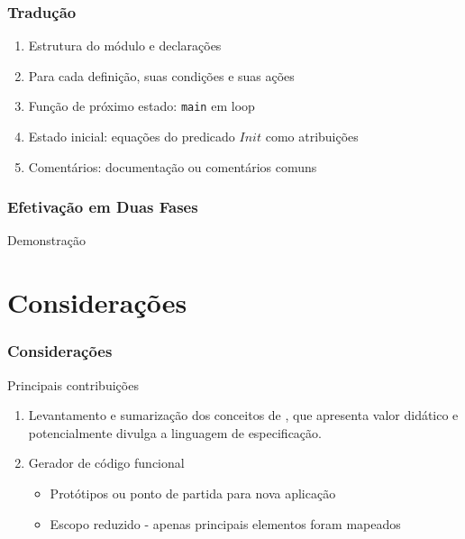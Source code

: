 \documentclass{beamer}
\begin{document}
\begin{frame}
  \frametitle{Tradução}

  \begin{enumerate}
    \item Estrutura do módulo e declarações

    \item Para cada definição, suas condições e suas ações

    \item Função de próximo estado: \texttt{main} em loop

    \item Estado inicial: equações do predicado $Init$ como atribuições

    \item Comentários: documentação ou comentários comuns

  \end{enumerate}
\end{frame}

\begin{frame}
  \frametitle{Efetivação em Duas Fases}
  Demonstração
\end{frame}

\section{Considerações}

\begin{frame}
  \frametitle{Considerações}

  Principais contribuições
  \begin{enumerate}
    \item Levantamento e sumarização dos conceitos de \TLAA, que apresenta valor
      didático e potencialmente divulga a linguagem de especificação.
    \item Gerador de código funcional
      \begin{itemize}
        \item Protótipos ou ponto de partida para nova aplicação
        \item Escopo reduzido - apenas principais elementos foram mapeados
      \end{itemize}
  \end{enumerate}

\end{frame}
\end{document}
